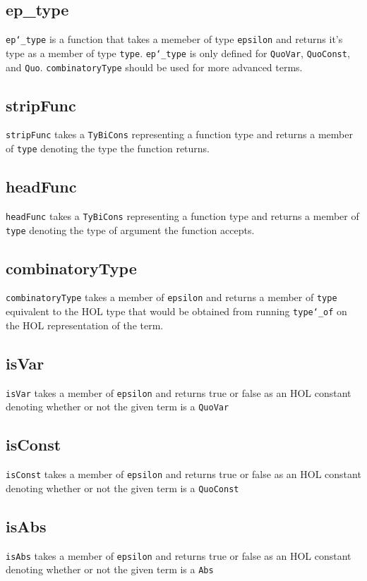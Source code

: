 \documentclass{article}
\def\c#1{\texttt{#1}}
\begin{document}
\subsection{ep\_type}
\c{ep\char`\_type} is a function that takes a memeber of type \c{epsilon} and returns it's type as a member of type \c{type}. \c{ep\char`\_type} is only defined for \c{QuoVar}, \c{QuoConst}, and \c{Quo}. \c{combinatoryType} should be used for more advanced terms.

\subsection{stripFunc}
\c{stripFunc} takes a \c{TyBiCons} representing a function type and returns a member of \c{type} denoting the type the function returns.

\subsection{headFunc}
\c{headFunc} takes a \c{TyBiCons} representing a function type and returns a member of \c{type} denoting the type of argument the function accepts.

\subsection{combinatoryType}
\c{combinatoryType} takes a member of \c{epsilon} and returns a member of \c{type} equivalent to the HOL type that would be obtained from running \c{type\char`\_of} on the HOL representation of the term.

\subsection{isVar}
\c{isVar} takes a member of \c{epsilon} and returns true or false as an HOL constant denoting whether or not the given term is a \c{QuoVar}

\subsection{isConst}
\c{isConst} takes a member of \c{epsilon} and returns true or false as an HOL constant denoting whether or not the given term is a \c{QuoConst}

\subsection{isAbs}
\c{isAbs} takes a member of \c{epsilon} and returns true or false as an HOL constant denoting whether or not the given term is a \c{Abs}
\end{document}
